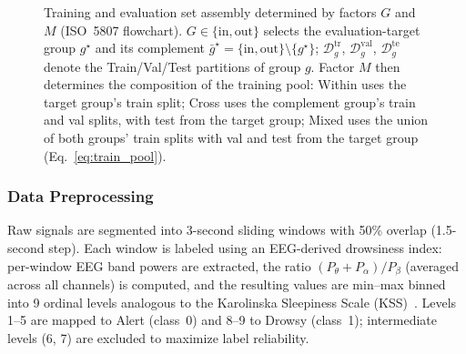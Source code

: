 \documentclass[lettersize,journal]{IEEEtran}
\begin{document}
\begin{figure}[!t]
\centering
\resizebox{\columnwidth}{!}{}
\caption{Training and evaluation set assembly determined by factors $G$ and $M$ (ISO~5807 flowchart). $G \in \{\mathrm{in}, \mathrm{out}\}$ selects the evaluation-target group $g^{\star}$ and its complement $\bar{g}^{\star} = \{\mathrm{in},\mathrm{out}\}\setminus\{g^{\star}\}$; $\mathcal{D}^{\mathrm{tr}}_{g}$, $\mathcal{D}^{\mathrm{val}}_{g}$, $\mathcal{D}^{\mathrm{te}}_{g}$ denote the Train/Val/Test partitions of group $g$. Factor $M$ then determines the composition of the training pool: Within uses the target group's train split; Cross uses the complement group's train and val splits, with test from the target group; Mixed uses the union of both groups' train splits with val and test from the target group (Eq.~\eqref{eq:train_pool}).}
\label{fig:framework_routing}
\end{figure}

\subsubsection{Data Preprocessing}\label{sec:preprocessing}
Raw signals are segmented into 3-second sliding windows with 50\% overlap (1.5-second step).
Each window is labeled using an EEG-derived drowsiness index: per-window EEG band powers are extracted, the ratio $(P_\theta + P_\alpha) / P_\beta$ (averaged across all channels) is computed, and the resulting values are min--max binned into 9 ordinal levels analogous to the Karolinska Sleepiness Scale (KSS)~\cite{akerstedt1990}.
Levels 1--5 are mapped to Alert (class~0) and 8--9 to Drowsy (class~1); intermediate levels (6, 7) are excluded to maximize label reliability.
\end{document}
